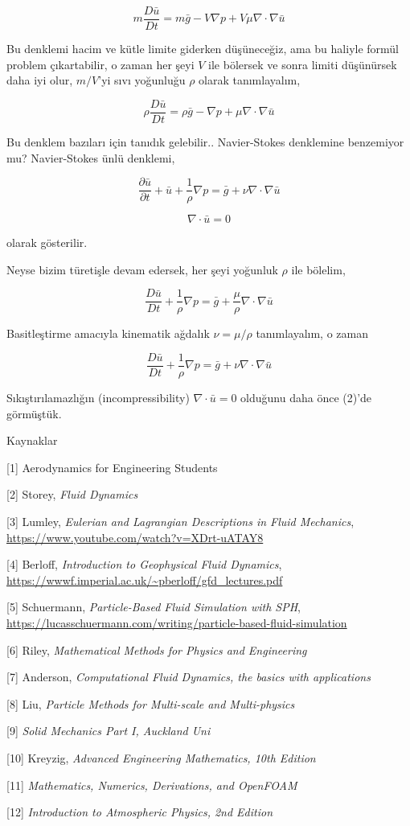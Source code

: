 \documentclass[12pt,fleqn]{article}\usepackage{../../common}
\begin{document}
$$
m \frac{D \bar{u}}{D t} = m\bar{g} - V \nabla p + V \mu \nabla \cdot \nabla \bar{u}
$$

Bu denklemi hacim ve kütle limite giderken düşüneceğiz, ama bu haliyle formül
problem çıkartabilir, o zaman her şeyi $V$ ile bölersek ve sonra limiti
düşünürsek daha iyi olur, $m/V$'yi sıvı yoğunluğu $\rho$ olarak tanımlayalım,

$$
\rho \frac{D \bar{u}}{D t} = \rho \bar{g} -
\nabla p +
\mu \nabla \cdot \nabla \bar{u}
$$

Bu denklem bazıları için tanıdık gelebilir.. Navier-Stokes denklemine benzemiyor
mu? Navier-Stokes ünlü denklemi,

$$
\frac{\partial \bar{u}}{\partial t} + \bar{u} + \frac{1}{\rho} \nabla p =
\bar{g} + \nu \nabla \cdot \nabla \bar{u}
$$

$$
\nabla \cdot \bar{u} = 0
$$

olarak gösterilir.

Neyse bizim türetişle devam edersek, her şeyi yoğunluk $\rho$ ile bölelim,

$$
\frac{D \bar{u}}{D t} + \frac{1}{\rho} \nabla p =
\bar{g}  + \frac{\mu}{\rho} \nabla \cdot \nabla \bar{u}
$$

Basitleştirme amacıyla kinematik ağdalık $\nu = \mu / \rho$ tanımlayalım, o
zaman 

$$
\frac{D \bar{u}}{D t} + \frac{1}{\rho} \nabla p =
\bar{g}  + \nu \nabla \cdot \nabla \bar{u}
$$

Sıkıştırılamazlığın (incompressibility) $\nabla \cdot \bar{u} = 0$ olduğunu daha
önce (2)'de görmüştük.

Kaynaklar

[1] Aerodynamics for Engineering Students

[2] Storey, {\em Fluid Dynamics}

[3] Lumley, {\em Eulerian and Lagrangian Descriptions in Fluid Mechanics},
    \url{https://www.youtube.com/watch?v=XDrt-uATAY8}

[4] Berloff, {\em Introduction to Geophysical Fluid Dynamics},
    \url{https://wwwf.imperial.ac.uk/~pberloff/gfd_lectures.pdf}

[5] Schuermann, {\em Particle-Based Fluid Simulation with SPH},
    \url{https://lucasschuermann.com/writing/particle-based-fluid-simulation}

[6] Riley, {\em Mathematical Methods for Physics and Engineering}

[7] Anderson, {\em Computational Fluid Dynamics, the basics with applications}

[8] Liu, {\em Particle Methods for Multi-scale and Multi-physics}

[9] {\em Solid Mechanics Part I, Auckland Uni}

[10] Kreyzig, {\em Advanced Engineering Mathematics, 10th Edition}

[11] {\em Mathematics, Numerics, Derivations, and OpenFOAM}

[12] {\em Introduction to Atmospheric Physics, 2nd Edition}
\end{document}

